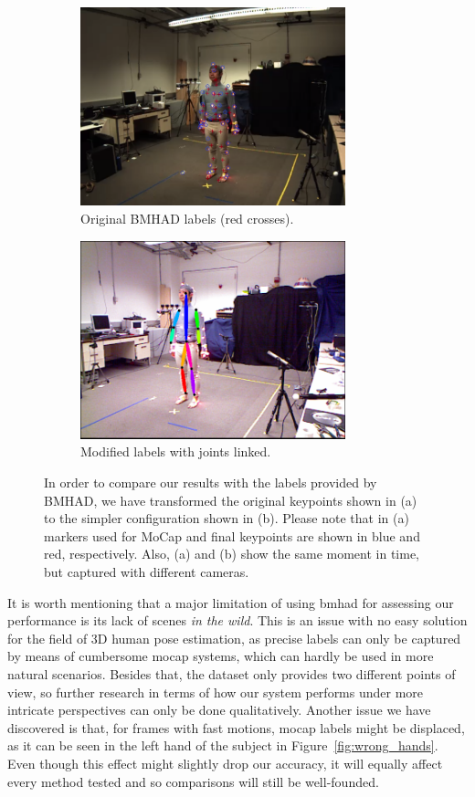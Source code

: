 \begin{figure}[h]\centering
    \begin{subfigure}{0.47\textwidth}\centering
        \includegraphics[height=5.75cm]{figures/labels_original.png} 
        \caption{Original BMHAD labels (red crosses).}
        \label{subfig:cp_general}
    \end{subfigure}
    \begin{subfigure}{0.51\textwidth}\centering
        \includegraphics[height=5.75cm]{figures/labels_modified.png}
        \caption{Modified labels with joints linked.}
        \label{subfig:cp_particular}
    \end{subfigure}
    \caption{In order to compare our results with the labels provided by BMHAD, we have transformed the original keypoints shown in (a) to the simpler configuration shown in (b). Please note that in (a) markers used for MoCap and final keypoints are shown in blue and red, respectively. Also, (a) and (b) show the same moment in time, but captured with different cameras.}
    \label{fig:bmhad_labels}
\end{figure}

It is worth mentioning that a major limitation of using \gls{bmhad} for assessing our performance is its lack of scenes \emph{in the wild}. This is an issue with no easy solution for the field of 3D human pose estimation, as precise labels can only be captured by means of cumbersome \gls{mocap} systems, which can hardly be used in more natural scenarios. Besides that, the dataset only provides two different points of view, so further research in terms of how our system performs under more intricate perspectives can only be done qualitatively. Another issue we have discovered is that, for frames with fast motions, \gls{mocap} labels might be displaced, as it can be seen in the left hand of the subject in Figure~\ref{fig:wrong_hands}. Even though this effect might slightly drop our accuracy, it will equally affect every method tested and so comparisons will still be well-founded.

